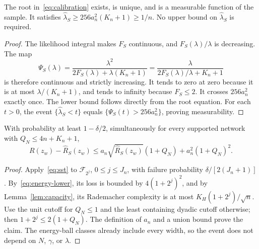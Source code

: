 \begin{lemma}
\label{lem:root}
The root in~\eqref{eq:calibration} exists, is unique, and is a measurable function of the sample. It satisfies
$\widehat\lambda_S\ge256a_n^2(K_n+1)\ge1/n$.
No upper bound on $\widehat\lambda_S$ is required.
\end{lemma}
\begin{proof}
The likelihood integral makes $F_S$ continuous, and $F_S(\lambda)/\lambda$ is decreasing. The map
\[
 \Psi_S(\lambda)=\frac{\lambda^2}{2F_S(\lambda)+\lambda(K_n+1)}
 =\frac{\lambda}{2F_S(\lambda)/\lambda+K_n+1}
\]
is therefore continuous and strictly increasing. It tends to zero at zero because it is at most $\lambda/(K_n+1)$, and tends to infinity because $F_S\le2$. It crosses $256a_n^2$ exactly once. The lower bound follows directly from the root equation. For each $t>0$, the event $\{\widehat\lambda_S<t\}$ equals $\{\Psi_S(t)>256a_n^2\}$, proving measurability.
\end{proof}

\begin{lemma}
\label{lem:stat-event}
With probability at least $1-\delta/2$, simultaneously for every supported network with $Q_N\le4n+K_n+1$,
\begin{equation}
 R(z_w)-\widehat R_S(z_w)
 \le a_n\sqrt{\widehat R_S(z_w)}(1+Q_N)+a_n^2(1+Q_N)^2.
 \label{eq:stat-event}
\end{equation}
\end{lemma}
\begin{proof}
Apply~\eqref{eq:sst} to $\mathcal F_{2^j}$, $0\le j\le J_n$, with failure probability $\delta/[2(J_n+1)]$. By~\eqref{eq:energy-lower}, its loss is bounded by $4(1+2^j)^2$, and by Lemma~\ref{lem:capacity}, its Rademacher complexity is at most $K_H(1+2^j)/\sqrt n$. Use the unit cutoff for $Q_N\le1$ and the least containing dyadic cutoff otherwise; then $1+2^j\le2(1+Q_N)$. The definition of $a_n$ and a union bound prove the claim. The energy-ball classes already include every width, so the event does not depend on $N$, $\gamma$, or $\lambda$.
\end{proof}

